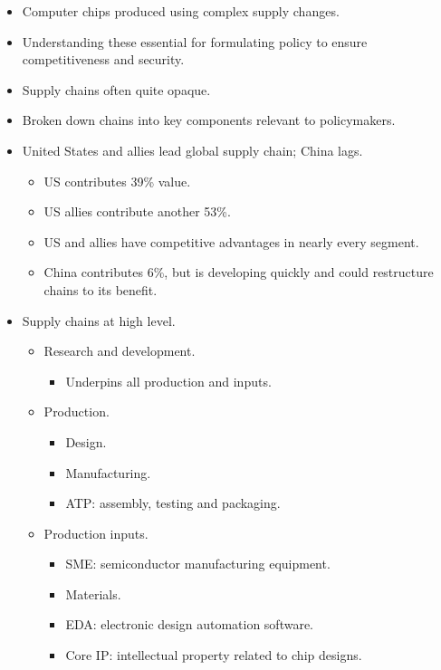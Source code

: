 \begin{itemize}
    \item Computer chips produced using complex supply changes.
    \item Understanding these essential for formulating policy to ensure competitiveness and security.
    \item Supply chains often quite opaque.
    \item Broken down chains into key components relevant to policymakers.
    \item United States and allies lead global supply chain; China lags.
    \begin{itemize}
        \item US contributes 39\% value.
        \item US allies contribute another 53\%.
        \item US and allies have competitive advantages in nearly every segment.
        \item China contributes 6\%, but is developing quickly and could restructure chains to its benefit.
    \end{itemize}
    \item Supply chains at high level.
    \begin{itemize}
        \item Research and development.
        \begin{itemize}
            \item Underpins all production and inputs.
        \end{itemize}
        \item Production.
        \begin{itemize}
            \item Design.
            \item Manufacturing.
            \item ATP: assembly, testing and packaging.
        \end{itemize}
        \item Production inputs.
        \begin{itemize}
            \item SME: semiconductor manufacturing equipment.
            \item Materials.
            \item EDA: electronic design automation software.
            \item Core IP: intellectual property related to chip designs.
        \end{itemize}

\end{itemize}
\end{itemize}
